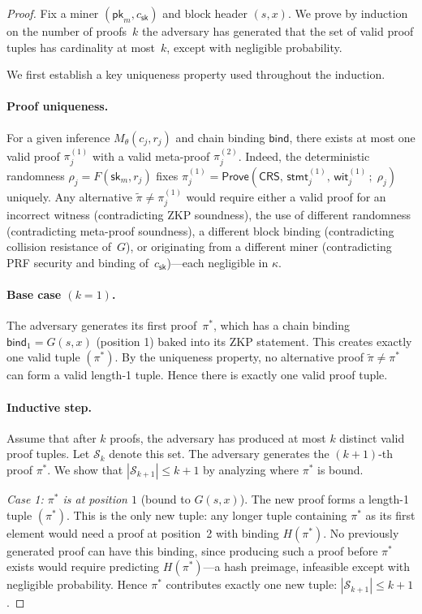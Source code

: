 \begin{proof}
Fix a miner $(\mathsf{pk}_m, c_{\mathsf{sk}})$ and block header $(s, x)$. We prove by induction on the number of proofs~$k$ the adversary has generated that the set of valid proof tuples has cardinality at most~$k$, except with negligible probability. 

We first establish a key uniqueness property used throughout the induction.

\paragraph{Proof uniqueness.}
For a given inference $M_\theta(c_j, r_j)$ and chain binding $\mathsf{bind}$, there exists at most one valid proof $\pi_j^{(1)}$ with a valid meta-proof $\pi_j^{(2)}$. Indeed, the deterministic randomness $\rho_j = F(\mathsf{sk}_m, r_j)$ fixes $\pi_j^{(1)} = \mathsf{Prove}(\mathsf{CRS},\, \mathsf{stmt}_j^{(1)},\, \mathsf{wit}_j^{(1)}\,;\; \rho_j)$ uniquely. Any alternative $\tilde{\pi} \neq \pi_j^{(1)}$ would require either a valid proof for an incorrect witness (contradicting ZKP soundness), the use of different randomness (contradicting meta-proof soundness), a different block binding (contradicting collision resistance of~$G$), or originating from a different miner (contradicting PRF security and binding of~$c_{\mathsf{sk}}$)---each negligible in $\kappa$.

\paragraph{Base case $(k = 1)$.}
The adversary generates its first proof~$\pi^*$, which has a chain binding $\mathsf{bind}_1 = G(s,x)$ (position 1) baked into its ZKP statement. This creates exactly one valid tuple $(\pi^*)$. By the uniqueness property, no alternative proof $\tilde{\pi} \neq \pi^*$ can form a valid length-1 tuple. Hence there is exactly one valid proof tuple.

\paragraph{Inductive step.}
Assume that after $k$ proofs, the adversary has produced at most $k$ distinct valid proof tuples. Let $\mathcal{S}_k$ denote this set. The adversary generates the $(k+1)$-th proof $\pi^*$. We show that $|\mathcal{S}_{k+1}| \leq k + 1$ by analyzing where $\pi^*$ is bound.

\emph{Case 1: $\pi^*$ is at position $1$} (bound to $G(s,x)$). The new proof forms a length-1 tuple $(\pi^*)$. This is the only new tuple: any longer tuple containing $\pi^*$ as its first element would need a proof at position~2 with binding $H(\pi^*)$. No previously generated proof can have this binding, since producing such a proof before $\pi^*$ exists would require predicting $H(\pi^*)$---a hash preimage, infeasible except with negligible probability. Hence $\pi^*$ contributes exactly one new tuple: $|\mathcal{S}_{k+1}| \leq k + 1$.


\end{proof}
